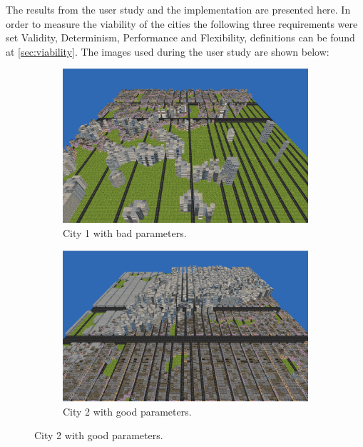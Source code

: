 The results from the user study and the implementation are presented here. In order to measure the viability of the cities the following three requirements were set Validity, Determinism, Performance and Flexibility, definitions can be found at \ref{sec:viability}. The images used during the user study are shown below:

\begin{figure}[h]
	\centering
	\begin{subfigure}{0.4\textwidth}
		\centering
		\includegraphics[width=0.9\linewidth]{"Images/bad parameters"}
		\caption*{City 1 with bad parameters.}
		\label{fig:bad-parameters}
	\end{subfigure}
	\begin{subfigure}{0.4\textwidth}
		\centering
		\includegraphics[width=0.9\linewidth]{"Images/good parameters 02"}
		\caption*{City 2 with good parameters.}
		\label{fig:good-parameters-02}
	\end{subfigure}
	\label{fig:city12}
\end{figure}

